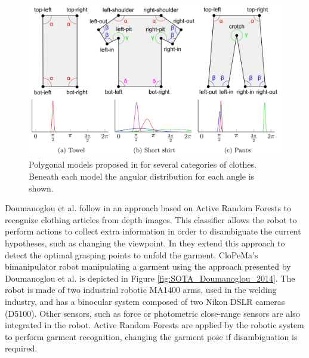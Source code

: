 \begin{figure}[thpb]
    \centering
    \includegraphics[width=\textwidth]{figures/SOTA_Stria_2014-3.png}
    \caption[Polygonal models proposed by Stria et al.]
    {Polygonal models proposed in \cite{Stria2014} for several categories of clothes. Beneath each model the angular distribution for each angle is shown.}
    \label{fig:SOTA_Stria_2014}
\end{figure}


Doumanoglou et al. follow in \cite{Doumanoglou2014ECCV} an approach based on Active Random Forests to recognize clothing articles from depth images. This classifier allows the robot to perform actions to collect extra information in order to disambiguate the current hypotheses, such as changing the viewpoint. In \cite{Doumanoglou2014ICRA} they extend this approach to detect the optimal grasping points to unfold the garment. CloPeMa's bimanipulator robot manipulating a garment using the approach presented by Doumanoglou et al. is depicted in Figure \ref{fig:SOTA_Doumanoglou_2014}. The robot is made of two industrial robotic MA1400 arms, used in the welding industry, and has a binocular system composed of two Nikon DSLR cameras (D5100). Other sensors, such as force or photometric close-range sensors are also integrated in the robot. Active Random Forests are applied by the robotic system to perform garment recognition, changing the garment pose if disambiguation is required.


